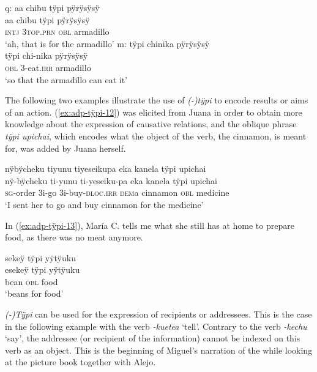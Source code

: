 \ea\label{ex:adp-tÿpi-1}
  \ea\label{ex:adp-tÿpi-1.1}
\begingl
\glpreamble \textup{q:} aa chibu tÿpi pÿrÿsÿsÿ\\
\gla aa chibu tÿpi pÿrÿsÿsÿ\\
\glb \textsc{intj} 3\textsc{top.prn} \textsc{obl} armadillo\\
\glft ‘ah, that is for the armadillo’
\endgl
  \ex\label{ex:adp-tÿpi-1.2}
\begingl
\glpreamble \textup{m:} tÿpi chinika pÿrÿsÿsÿ\\
\gla tÿpi chi-nika pÿrÿsÿsÿ\\
\glb \textsc{obl} 3-eat.\textsc{irr} armadillo\\
\glft ‘so that the armadillo can eat it’
\endgl
\trailingcitation{[mqx-p110826l.578-580]}
\z
\xe
{}

\largerpage[-2]
The following two examples illustrate the use of \textit{(-)tÿpi} to encode results or aims of an action. (\ref{ex:adp-tÿpi-12}) was elicited from Juana in order to obtain more knowledge about the expression of causative relations, and the oblique phrase \textit{tÿpi upichai}, which encodes what the object of the verb, the cinnamon, is meant for, was added by Juana herself.

\ea\label{ex:adp-tÿpi-12}
\begingl
\glpreamble nÿbÿcheku tiyunu tiyeseikupa eka kanela tÿpi upichai\\
\gla nÿ-bÿcheku ti-yunu ti-yeseiku-pa eka kanela tÿpi upichai\\
\textsc{sg}-order 3i-go 3i-buy-\textsc{dloc.irr} \textsc{dem}a cinnamon \textsc{obl} medicine\\
\glft ‘I sent her to go and buy cinnamon for the medicine’
\endgl
\trailingcitation{[jxx-e191021e-2]}
\xe

In (\ref{ex:adp-tÿpi-13}), María C. tells me what she still has at home to prepare food, as there was no meat anymore.

\ea\label{ex:adp-tÿpi-13}
\begingl
\glpreamble sekeÿ tÿpi yÿtÿuku\\
\gla esekeÿ tÿpi yÿtÿuku\\
\glb bean \textsc{obl} food\\
\glft ‘beans for food’
\endgl
\trailingcitation{[uxx-e120427l.203]}
\xe
{}

\textit{(-)Tÿpi} can be used for the expression of recipients or addressees. This is the case in the following example with the verb \textit{-kuetea} ‘tell’. Contrary to the verb \textit{-kechu} ‘say’, the addressee (or recipient of the information) cannot be indexed on this verb as an object. This is the beginning of Miguel’s narration of the  while looking at the picture book together with Alejo.


